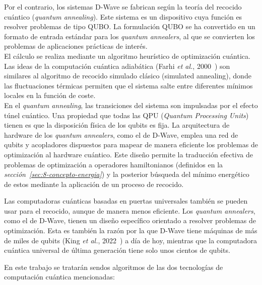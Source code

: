 Por el contrario, los sistemas D-Wave se fabrican según la teoría del recocido cuántico (\textit{quantum annealing}).
Este sistema es un dispositivo cuya función es resolver problemas de tipo QUBO\@.
La formulación QUBO se ha convertido en un formato de entrada estándar para los \textit{quantum annealers}, al que se convierten los problemas de aplicaciones prácticas de interés.
\\
El cálculo se realiza mediante un algoritmo heurístico de optimización cuántica.
Las ideas de la computación cuántica adiabática (Farhi \textit{et al.}, 2000~\cite{aqc}) son similares al algoritmo de recocido simulado clásico (simulated annealing), donde las fluctuaciones térmicas permiten que el sistema salte entre diferentes mínimos locales en la función de coste.
\\
En el \textit{quantum annealing}, las transiciones del sistema son impulsadas por el efecto túnel cuántico.
Una propiedad que todas las QPU (\textit{Quantum Processing Units}) tienen es que la disposición física de los qubits es fija.
La arquitectura de hardware de los \textit{quantum annealers}, como el de D-Wave, emplea una red de qubits y acopladores dispuestos para mapear de manera eficiente los problemas de optimización al hardware cuántico.
Este diseño permite la traducción efectiva de problemas de optimización a operadores hamiltonianos (definidos en la \textit{sección~\ref{sec:8-concepto-energia}}) y la posterior búsqueda del mínimo energético de estos mediante la aplicación de un proceso de recocido.

Las computadoras cuánticas basadas en puertas universales también se pueden usar para el recocido, aunque de manera menos eficiente.
Los \textit{quantum annealers}, como el de D-Wave, tienen un diseño específico orientado a resolver problemas de optimización.
Esta es también la razón por la que D-Wave tiene máquinas de más de miles de qubits (King \textit{et al.}, 2022~\cite{2000_dwave-King_2022}) a día de hoy, mientras que la computadora cuántica universal de última generación tiene solo unos cientos de qubits\cite{ibm_roadmap}.

En este trabajo se tratarán sendos algoritmos de las dos tecnologías de computación cuántica mencionadas:

